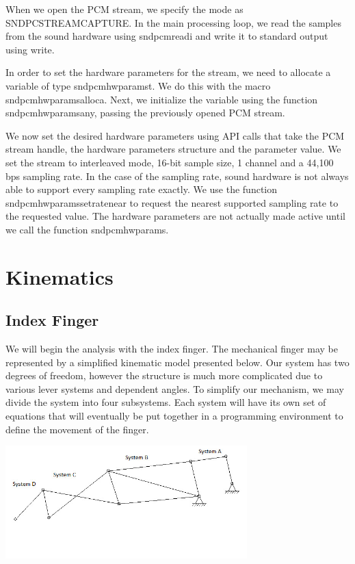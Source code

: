 \documentclass{article}
\begin{document}
When we open the PCM stream, we specify the mode as SND\textunderscore PC\textunderscore STREAM\textunderscore CAPTURE. In the main processing loop, we read the samples from the sound hardware using snd\textunderscore pcm\textunderscore readi and write it to standard output using write. 

In order to set the hardware parameters for the stream, we need to allocate a variable of type snd\textunderscore pcm\textunderscore hw\textunderscore params\textunderscore t. We do this with the macro snd\textunderscore pcm\textunderscore hw\textunderscore params\textunderscore alloca. Next, we initialize the variable using the function snd\textunderscore pcm\textunderscore hw\textunderscore params\textunderscore any, passing the previously opened PCM stream. 

We now set the desired hardware parameters using API calls that take the PCM stream handle, the hardware parameters structure and the parameter value. We set the stream to interleaved mode, 16-bit sample size, 1 channel and a 44,100 bps sampling rate. In the case of the sampling rate, sound hardware is not always able to support every sampling rate exactly. We use the function snd\textunderscore pcm\textunderscore hw\textunderscore params\textunderscore set\textunderscore rate\textunderscore near to request the nearest supported sampling rate to the requested value. The hardware parameters are not actually made active until we call the function snd\textunderscore pcm\textunderscore hw\textunderscore params.

\break
\section{Kinematics}
\subsection{Index Finger}
We will begin the analysis with the index finger. The mechanical finger may be represented by a simplified kinematic model presented below. Our system has two degrees of freedom, however the structure is much more complicated due to various lever systems and dependent angles. To simplify our mechanism, we may divide the system into four subsystems. Each system will have its own set of equations that will eventually be put together in a programming environment to define the movement of the finger.

\begin{center}
\includegraphics[width=0.7\textwidth]{IMG/IK_01.jpeg}
\end{center}
\end{document}
